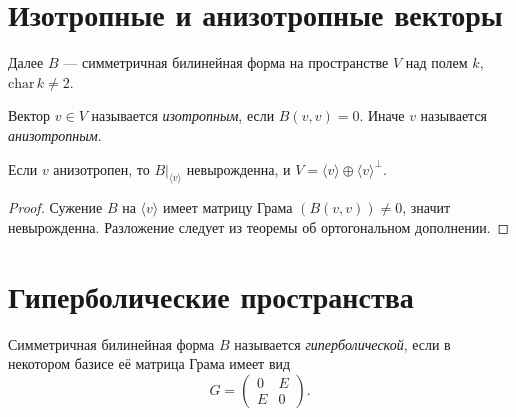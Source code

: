 \section{Изотропные и анизотропные векторы}

Далее $B$ --- симметричная билинейная форма на пространстве $V$ над полем $k$, $\mathrm{char}\, k \neq 2$.

\begin{definition}
    Вектор $v \in V$ называется \emph{изотропным}, если $B(v, v) = 0$. Иначе $v$ называется \emph{анизотропным}.
\end{definition}


\begin{stmt}
    Если $v$ анизотропен, то $B\big|_{\langle v \rangle}$ невырожденна, и $V = \langle v \rangle \oplus \langle v \rangle^\perp$.
    \begin{proof}
        Сужение $B$ на $\langle v \rangle$ имеет матрицу Грама $(B(v,v)) \neq 0$, значит невырожденна.
        Разложение следует из теоремы об ортогональном дополнении.
    \end{proof}
\end{stmt}


\section{Гиперболические пространства}

\begin{definition}
    Симметричная билинейная форма $B$ называется \emph{гиперболической}, если в некотором базисе её матрица Грама имеет вид
    \[
        G = \begin{pmatrix} 0 & E \\ E & 0 \end{pmatrix}.
    \]
\end{definition}


